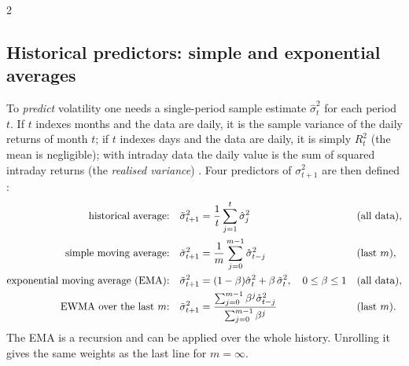 \begin{paracol}{2}
\subsection{Historical predictors: simple and exponential averages}\label{ch13:sec-ewma}
To \emph{predict} volatility one needs a single-period sample estimate $\hat\sigma_t^2$ for each period
$t$. If $t$ indexes months and the data are daily, it is the sample variance of the daily returns of month $t$; if $t$
indexes days and the data are daily, it is simply $R_t^2$ (the mean is negligible); with intraday data the daily value is the sum of
squared intraday returns (the \emph{realised variance}) . Four predictors
of $\sigma^2_{t+1}$ are then defined :
\begin{align}
  \text{historical average:}&\quad \tilde\sigma^2_{t+1}=\frac1t\sum_{j=1}^t\hat\sigma_j^2 &&\text{(all data)},\notag\\
  \text{simple moving average:}&\quad \tilde\sigma^2_{t+1}=\frac1m\sum_{j=0}^{m-1}\hat\sigma^2_{t-j} &&\text{(last $m$)},\notag\\
  \text{exponential moving average (EMA):}&\quad \tilde\sigma^2_{t+1}=(1-\beta)\hat\sigma^2_t+\beta\,\tilde\sigma^2_t,\quad 0\le\beta\le1
  &&\text{(all data)},\label{ch13:eq-ema}\\
  \text{EWMA over the last $m$:}&\quad \tilde\sigma^2_{t+1}=\frac{\sum_{j=0}^{m-1}\beta^j\hat\sigma^2_{t-j}}{\sum_{j=0}^{m-1}\beta^j}
  &&\text{(last $m$)}.\notag
\end{align}
The EMA is a recursion and can be applied over the whole history. Unrolling it gives the same weights as the last
line for $m=\infty$.


\end{paracol}
